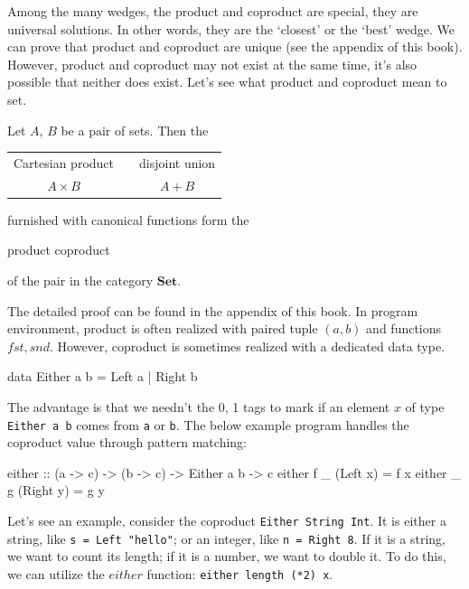 \documentclass[b5paper]{article}
\begin{document}
Among the many wedges, the product and coproduct are special, they are universal solutions. In other words, they are the `closest' or the `best' wedge. We can prove that product and coproduct are unique (see the appendix of this book). However, product and coproduct may not exist at the same time, it's also possible that neither does exist. Let's see what product and coproduct mean to set.

\begin{lemma}
\normalfont
Let $A$, $B$ be a pair of sets. Then the

\begin{center}
\begin{tabular}{ccc}
Cartesian product & \quad \quad \quad & disjoint union \\
$A \times B$ & \quad \quad \quad & $A + B$ \\
\end{tabular}
\end{center}

furnished with canonical functions form the

\begin{center}
product \quad \quad \quad coproduct
\end{center}

of the pair in the category $\pmb{Set}$.
\end{lemma}

The detailed proof can be found in the appendix of this book. In program environment, product is often realized with paired tuple $(a, b)$ and functions $fst, snd$. However, coproduct is sometimes realized with a dedicated data type.

\begin{Haskell}[frame = single]
data Either a b = Left a | Right b
\end{Haskell}

The advantage is that we needn't the 0, 1 tags to mark if an element $x$ of type \texttt{Either a b} comes from \texttt{a} or \texttt{b}. The below example program handles the coproduct value through pattern matching:

\begin{Haskell}
either :: (a -> c) -> (b -> c) -> Either a b -> c
either f _ (Left x)     =  f x
either _ g (Right y)    =  g y
\end{Haskell}
\lstset{frame = none}

Let's see an example, consider the coproduct \texttt{Either String Int}. It is either a string, like \texttt{s = Left "hello"}; or an integer, like \texttt{n = Right 8}. If it is a string, we want to count its length; if it is a number, we want to double it. To do this, we can utilize the $either$ function: \texttt{either length (*2) x}.
\end{document}

